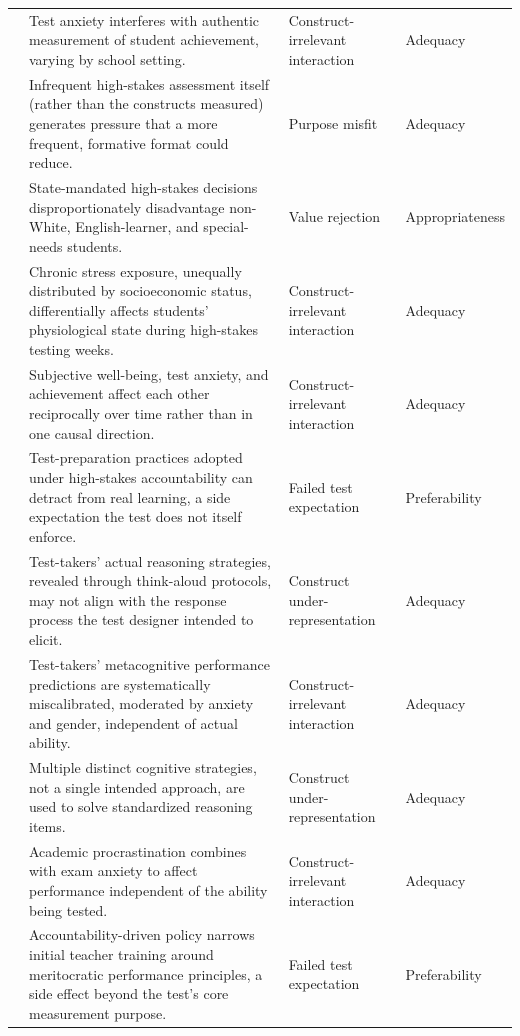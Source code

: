 \documentclass[11pt]{article}
\begin{document}
{\begin{longtable}{p{2.6cm} p{8.6cm} p{2.6cm} p{1.7cm}}
\citet{vonderembse2012settings} & Test anxiety interferes with authentic measurement of student achievement, varying by school setting. & Construct-irrelevant interaction & Adequacy \\
\citet{yeh2006rapid} & Infrequent high-stakes assessment itself (rather than the constructs measured) generates pressure that a more frequent, formative format could reduce. & Purpose misfit & Adequacy \\
\citet{horn2003cycle} & State-mandated high-stakes decisions disproportionately disadvantage non-White, English-learner, and special-needs students. & Value rejection & Appropriateness \\
\citet{heissel2019physio} & Chronic stress exposure, unequally distributed by socioeconomic status, differentially affects students' physiological state during high-stakes testing weeks. & Construct-irrelevant interaction & Adequacy \\
\citet{steinmayr2016wellbeing} & Subjective well-being, test anxiety, and achievement affect each other reciprocally over time rather than in one causal direction. & Construct-irrelevant interaction & Adequacy \\
\citet{gulek2003preparing} & Test-preparation practices adopted under high-stakes accountability can detract from real learning, a side expectation the test does not itself enforce. & Failed test expectation & Preferability \\
\citet{brizuela2016autorreportes} & Test-takers' actual reasoning strategies, revealed through think-aloud protocols, may not align with the response process the test designer intended to elicit. & Construct under-representation & Adequacy \\
\citet{chacon2025simulacion} & Test-takers' metacognitive performance predictions are systematically miscalibrated, moderated by anxiety and gender, independent of actual ability. & Construct-irrelevant interaction & Adequacy \\
\citet{jimenez2018validacion} & Multiple distinct cognitive strategies, not a single intended approach, are used to solve standardized reasoning items. & Construct under-representation & Adequacy \\
\citet{manchado2021procrastinacion} & Academic procrastination combines with exam anxiety to affect performance independent of the ability being tested. & Construct-irrelevant interaction & Adequacy \\
\citet{carrasco2019formacion} & Accountability-driven policy narrows initial teacher training around meritocratic performance principles, a side effect beyond the test's core measurement purpose. & Failed test expectation & Preferability \\
\end{longtable}
}
\end{document}
